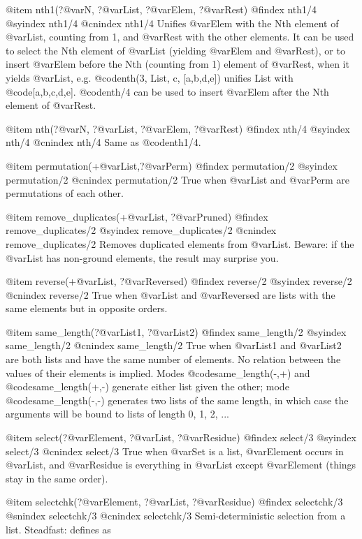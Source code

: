{{{{{{{{@item nth1(?@var{N}, ?@var{List}, ?@var{Elem}, ?@var{Rest})
@findex nth1/4
@syindex nth1/4
@cnindex nth1/4
Unifies @var{Elem} with the Nth element of @var{List}, counting from 1,
and @var{Rest} with the other elements.  It can be used to select the
Nth element of @var{List} (yielding @var{Elem} and @var{Rest}), or to
insert @var{Elem} before the Nth (counting from 1) element of
@var{Rest}, when it yields @var{List}, e.g. @code{nth(3, List, c,
[a,b,d,e])} unifies List with @code{[a,b,c,d,e]}.  @code{nth/4}
can be used to insert @var{Elem} after the Nth element of @var{Rest}.

@item nth(?@var{N}, ?@var{List}, ?@var{Elem}, ?@var{Rest})
@findex nth/4
@syindex nth/4
@cnindex nth/4
Same as @code{nth1/4}.

@item permutation(+@var{List},?@var{Perm})
@findex permutation/2
@syindex permutation/2
@cnindex permutation/2
True when @var{List} and @var{Perm} are permutations of each other.

@item remove_duplicates(+@var{List}, ?@var{Pruned})
@findex remove_duplicates/2
@syindex remove_duplicates/2
@cnindex remove_duplicates/2
Removes duplicated elements from @var{List}.  Beware: if the @var{List} has
non-ground elements, the result may surprise you.

@item reverse(+@var{List}, ?@var{Reversed})
@findex reverse/2
@syindex reverse/2
@cnindex reverse/2
True when @var{List} and @var{Reversed} are lists with the same elements
but in opposite orders. 
 
@item same_length(?@var{List1}, ?@var{List2})
@findex same_length/2
@syindex same_length/2
@cnindex same_length/2
True when @var{List1} and @var{List2} are both lists and have the same number
of elements.  No relation between the values of their elements is
implied.
Modes @code{same_length(-,+)} and @code{same_length(+,-)} generate either list given
the other; mode @code{same_length(-,-)} generates two lists of the same length,
in which case the arguments will be bound to lists of length 0, 1, 2, ...

@item select(?@var{Element}, ?@var{List}, ?@var{Residue})
@findex select/3
@syindex select/3
@cnindex select/3
True when @var{Set} is a list, @var{Element} occurs in @var{List}, and
@var{Residue} is everything in @var{List} except @var{Element} (things
stay in the same order).
 
@item selectchk(?@var{Element}, ?@var{List}, ?@var{Residue})
@findex selectchk/3
@snindex selectchk/3
@cnindex selectchk/3
Semi-deterministic selection from a list. Steadfast: defines as

}}}}}}}}
